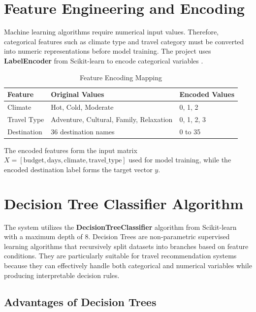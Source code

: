 \section{Feature Engineering and Encoding}

Machine learning algorithms require numerical input values. Therefore, categorical features such as climate type and travel category must be converted into numeric representations before model training. The project uses \textbf{LabelEncoder} from Scikit-learn to encode categorical variables \cite{pedregosa2011}.

\begin{table}[H]
    \centering
    \caption{Feature Encoding Mapping}
    \label{tab:feature-encoding}
    \begin{tabular}{@{}lll@{}}
        \toprule
        \textbf{Feature} & \textbf{Original Values} & \textbf{Encoded Values} \\
        \midrule
        Climate & Hot, Cold, Moderate & 0, 1, 2 \\
        Travel Type & Adventure, Cultural, Family, Relaxation & 0, 1, 2, 3 \\
        Destination & 36 destination names & 0 to 35 \\
        \bottomrule
    \end{tabular}
\end{table}

The encoded features form the input matrix $X = [\text{budget}, \allowbreak \text{days}, \allowbreak \text{climate}, \allowbreak \text{travel\_type}]$ used for model training, while the encoded destination label forms the target vector $y$.

\section{Decision Tree Classifier Algorithm}

The system utilizes the \textbf{DecisionTreeClassifier} algorithm from Scikit-learn \cite{pedregosa2011} with a maximum depth of 8. Decision Trees are non-parametric supervised learning algorithms that recursively split datasets into branches based on feature conditions. They are particularly suitable for travel recommendation systems because they can effectively handle both categorical and numerical variables while producing interpretable decision rules.

\subsection{Advantages of Decision Trees}

